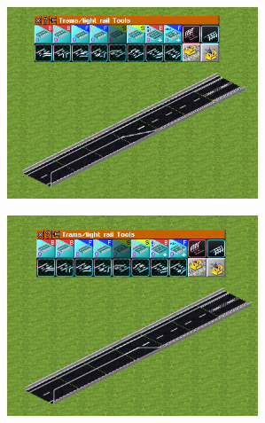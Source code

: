 \documentclass{jarticle}
\begin{document}
\begin{multicols}{2}
  \includegraphics[width = 75mm]{picture/20210214-road-4-6.png}

  \includegraphics[width = 75mm]{picture/20210214-road-4-7.png}
\end{multicols}

\vspace{10pt}
\end{document}
